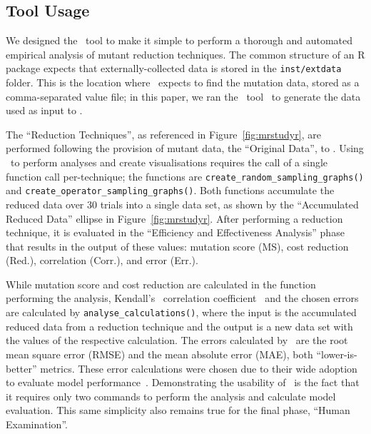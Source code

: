 \subsection{Tool Usage}




We designed the \mr~tool to make it simple to perform a thorough and automated empirical analysis of mutant reduction
techniques. The common structure of an R package expects that externally-collected data is stored in the
\texttt{inst/extdata} folder. This is the location where \mr~expects to find the mutation data, stored as a
comma-separated value file; in this paper, we ran the \sa~tool~\cite{McMinn2016} to generate the data used as input
to \mr.




The ``Reduction Techniques'', as referenced in Figure~\ref{fig:mrstudyr}, are performed following the provision of
mutant data, the ``Original Data'', to \mr. Using \mr~to perform analyses and create visualisations requires the call of
a single function call per-technique; the functions are {\texttt{create\_random\_sampling\_graphs()}} and
{\texttt{create\_operator\_sampling\_graphs()}}. Both functions accumulate the reduced data over 30 trials into a single
data set, as shown by the ``Accumulated Reduced Data'' ellipse in Figure~\ref{fig:mrstudyr}.  After performing a
reduction technique, it is evaluated in the ``Efficiency and Effectiveness Analysis'' phase that results in the output
of these values: mutation score (MS), cost reduction (Red.), correlation (Corr.), and error (Err.).


While mutation score and cost reduction are calculated in the function performing the analysis, Kendall's
\taub~correlation coefficient~\cite{mcminn2016virtual} and the chosen errors are calculated by
\texttt{analyse\_calculations()}, where the input is the accumulated reduced data from a reduction technique
and the output is a new data set with the values of the respective calculation.  The errors calculated by
\mr~are the root mean square error (RMSE) and the mean absolute error (MAE), both ``lower-is-better'' metrics.
These error calculations were chosen due to their wide adoption to evaluate model performance~\cite{chai2014root}.
Demonstrating the usability of \mr~is the fact that it requires only two commands to perform the analysis and
calculate model evaluation. This same simplicity also remains true for the final phase, ``Human Examination''.

